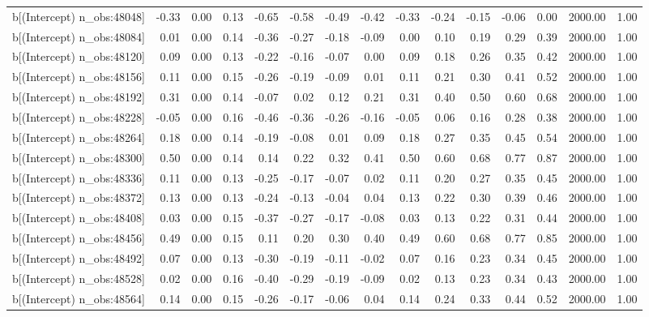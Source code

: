 \begin{table}[ht]
\begin{tabular}{rrrrrrrrrrrrrrr}
  b[(Intercept) n\_obs:48048] & -0.33 & 0.00 & 0.13 & -0.65 & -0.58 & -0.49 & -0.42 & -0.33 & -0.24 & -0.15 & -0.06 & 0.00 & 2000.00 & 1.00 \\ 
  b[(Intercept) n\_obs:48084] & 0.01 & 0.00 & 0.14 & -0.36 & -0.27 & -0.18 & -0.09 & 0.00 & 0.10 & 0.19 & 0.29 & 0.39 & 2000.00 & 1.00 \\ 
  b[(Intercept) n\_obs:48120] & 0.09 & 0.00 & 0.13 & -0.22 & -0.16 & -0.07 & 0.00 & 0.09 & 0.18 & 0.26 & 0.35 & 0.42 & 2000.00 & 1.00 \\ 
  b[(Intercept) n\_obs:48156] & 0.11 & 0.00 & 0.15 & -0.26 & -0.19 & -0.09 & 0.01 & 0.11 & 0.21 & 0.30 & 0.41 & 0.52 & 2000.00 & 1.00 \\ 
  b[(Intercept) n\_obs:48192] & 0.31 & 0.00 & 0.14 & -0.07 & 0.02 & 0.12 & 0.21 & 0.31 & 0.40 & 0.50 & 0.60 & 0.68 & 2000.00 & 1.00 \\ 
  b[(Intercept) n\_obs:48228] & -0.05 & 0.00 & 0.16 & -0.46 & -0.36 & -0.26 & -0.16 & -0.05 & 0.06 & 0.16 & 0.28 & 0.38 & 2000.00 & 1.00 \\ 
  b[(Intercept) n\_obs:48264] & 0.18 & 0.00 & 0.14 & -0.19 & -0.08 & 0.01 & 0.09 & 0.18 & 0.27 & 0.35 & 0.45 & 0.54 & 2000.00 & 1.00 \\ 
  b[(Intercept) n\_obs:48300] & 0.50 & 0.00 & 0.14 & 0.14 & 0.22 & 0.32 & 0.41 & 0.50 & 0.60 & 0.68 & 0.77 & 0.87 & 2000.00 & 1.00 \\ 
  b[(Intercept) n\_obs:48336] & 0.11 & 0.00 & 0.13 & -0.25 & -0.17 & -0.07 & 0.02 & 0.11 & 0.20 & 0.27 & 0.35 & 0.45 & 2000.00 & 1.00 \\ 
  b[(Intercept) n\_obs:48372] & 0.13 & 0.00 & 0.13 & -0.24 & -0.13 & -0.04 & 0.04 & 0.13 & 0.22 & 0.30 & 0.39 & 0.46 & 2000.00 & 1.00 \\ 
  b[(Intercept) n\_obs:48408] & 0.03 & 0.00 & 0.15 & -0.37 & -0.27 & -0.17 & -0.08 & 0.03 & 0.13 & 0.22 & 0.31 & 0.44 & 2000.00 & 1.00 \\ 
  b[(Intercept) n\_obs:48456] & 0.49 & 0.00 & 0.15 & 0.11 & 0.20 & 0.30 & 0.40 & 0.49 & 0.60 & 0.68 & 0.77 & 0.85 & 2000.00 & 1.00 \\ 
  b[(Intercept) n\_obs:48492] & 0.07 & 0.00 & 0.13 & -0.30 & -0.19 & -0.11 & -0.02 & 0.07 & 0.16 & 0.23 & 0.34 & 0.45 & 2000.00 & 1.00 \\ 
  b[(Intercept) n\_obs:48528] & 0.02 & 0.00 & 0.16 & -0.40 & -0.29 & -0.19 & -0.09 & 0.02 & 0.13 & 0.23 & 0.34 & 0.43 & 2000.00 & 1.00 \\ 
  b[(Intercept) n\_obs:48564] & 0.14 & 0.00 & 0.15 & -0.26 & -0.17 & -0.06 & 0.04 & 0.14 & 0.24 & 0.33 & 0.44 & 0.52 & 2000.00 & 1.00 \\ 

\end{tabular}
\end{table}
